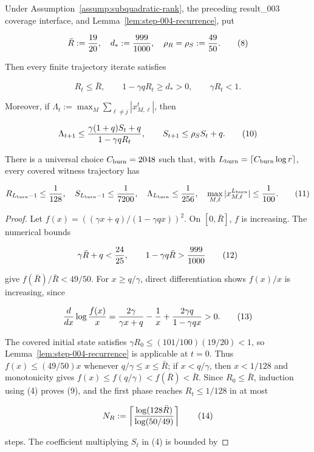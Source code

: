 \begin{proposition}\label{prop:step-004-envelope}
Under
Assumption~\ref{assump:subquadratic-rank}, the preceding result\_003 coverage
interface, and Lemma~\ref{lem:step-004-recurrence}, put

\[
\bar R:={19\over20},\quad d_*:={999\over1000},\quad
\rho_R=\rho_S:={49\over50}.
\tag{8}
\]

Then every finite trajectory iterate satisfies

\[
R_t\le\bar R,\qquad 1-\gamma qR_t\ge d_*>0,\qquad \gamma R_t<1.
\tag{9}
\]

Moreover, if \(\Lambda_t:=\max_M\sum_{\ell\ne j}|x_{M,\ell}^t|\), then

\[
\Lambda_{t+1}\le {\gamma(1+q)S_t+q\over1-\gamma qR_t},\qquad
S_{t+1}\le\rho_S S_t+q.
\tag{10}
\]

There is a universal choice \(C_{\rm burn}=2048\) such that, with
\(L_{\rm burn}=\lceil C_{\rm burn}\log r\rceil\), every covered witness
trajectory has

\[
R_{L_{\rm burn}-1}\le {1\over128},\quad
S_{L_{\rm burn}-1}\le {1\over7200},\quad
\Lambda_{L_{\rm burn}}\le {1\over256},\quad
\max_{M,\ell}|x_{M,\ell}^{L_{\rm burn}}|\le {1\over100}.
\tag{11}
\]

\begin{proof}
Let
\(f(x)=((\gamma x+q)/(1-\gamma qx))^2\). On
\([0,\bar R]\), \(f\) is increasing. The numerical bounds

\[
\gamma\bar R+q < {24\over25},\qquad
1-\gamma q\bar R>{999\over1000}
\tag{12}
\]

give \(f(\bar R)/\bar R<49/50\). For \(x\ge q/\gamma\), direct
differentiation shows \(f(x)/x\) is increasing, since

\[
{d\over dx}\log{f(x)\over x}
={2\gamma\over\gamma x+q}-{1\over x}
 +{2\gamma q\over1-\gamma qx}>0.
\tag{13}
\]

The covered initial state satisfies \(\gamma R_0\le(101/100)(19/20)<1\),
so Lemma~\ref{lem:step-004-recurrence} is applicable at \(t=0\).
Thus \(f(x)\le(49/50)x\) whenever \(q/\gamma\le x\le\bar R\); if
\(x<q/\gamma\), then \(x<1/128\) and monotonicity gives
\(f(x)\le f(q/\gamma)<f(\bar R)<\bar R\). Since \(R_0\le\bar R\),
induction using
(4) proves (9), and the first phase reaches \(R_t\le1/128\) in at most

\[
N_R:=\left\lceil{\log(128\bar R)\over\log(50/49)}\right\rceil
\tag{14}
\]

steps. The coefficient multiplying \(S_t\) in (4) is bounded by


\end{proof}
\end{proposition}
